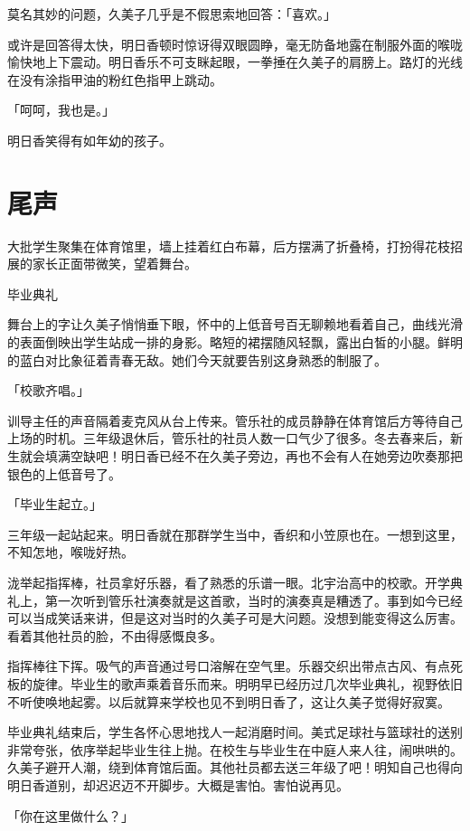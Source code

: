\documentclass[UTF8]{ctexart}
\begin{document}
    莫名其妙的问题，久美子几乎是不假思索地回答：「喜欢。」 

    或许是回答得太快，明日香顿时惊讶得双眼圆睁，毫无防备地露在制服外面的喉咙愉快地上下震动。明日香乐不可支眯起眼，一拳捶在久美子的肩膀上。路灯的光线在没有涂指甲油的粉红色指甲上跳动。 

    「呵呵，我也是。」 

    明日香笑得有如年幼的孩子。 

    \setcounter{secnumdepth}{-2}
    \section{尾声}
    大批学生聚集在体育馆里，墙上挂着红白布幕，后方摆满了折叠椅，打扮得花枝招展的家长正面带微笑，望着舞台。 

    毕业典礼 

    舞台上的字让久美子悄悄垂下眼，怀中的上低音号百无聊赖地看着自己，曲线光滑的表面倒映出学生站成一排的身影。略短的裙摆随风轻飘，露出白皙的小腿。鲜明的蓝白对比象征着青春无敌。她们今天就要告别这身熟悉的制服了。 

    「校歌齐唱。」 

    训导主任的声音隔着麦克风从台上传来。管乐社的成员静静在体育馆后方等待自己上场的时机。三年级退休后，管乐社的社员人数一口气少了很多。冬去春来后，新生就会填满空缺吧！明日香已经不在久美子旁边，再也不会有人在她旁边吹奏那把银色的上低音号了。 

    「毕业生起立。」 

    三年级一起站起来。明日香就在那群学生当中，香织和小笠原也在。一想到这里，不知怎地，喉咙好热。 

    泷举起指挥棒，社员拿好乐器，看了熟悉的乐谱一眼。北宇治高中的校歌。开学典礼上，第一次听到管乐社演奏就是这首歌，当时的演奏真是糟透了。事到如今已经可以当成笑话来讲，但是这对当时的久美子可是大问题。没想到能变得这么厉害。看着其他社员的脸，不由得感慨良多。 

    指挥棒往下挥。吸气的声音通过号口溶解在空气里。乐器交织出带点古风、有点死板的旋律。毕业生的歌声乘着音乐而来。明明早已经历过几次毕业典礼，视野依旧不听使唤地起雾。以后就算来学校也见不到明日香了，这让久美子觉得好寂寞。 

    毕业典礼结束后，学生各怀心思地找人一起消磨时间。美式足球社与篮球社的送别非常夸张，依序举起毕业生往上抛。在校生与毕业生在中庭人来人往，闹哄哄的。久美子避开人潮，绕到体育馆后面。其他社员都去送三年级了吧！明知自己也得向明日香道别，却迟迟迈不开脚步。大概是害怕。害怕说再见。 

    「你在这里做什么？」 
\end{document}
